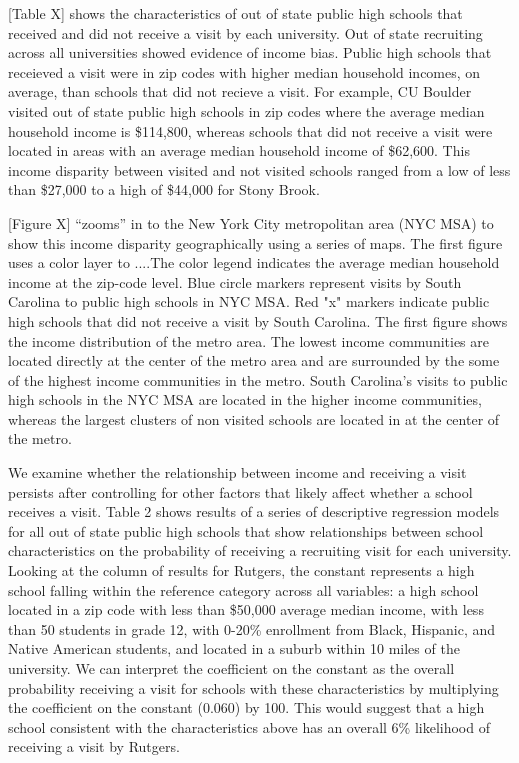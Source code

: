 \documentclass[twoside]{article}
\begin{document}
[Table X] shows the characteristics of out of state public high schools that received and did not receive a visit by each university. Out of state recruiting across all universities showed evidence of income bias. Public high schools that receieved a visit were in zip codes with higher median household incomes, on average, than schools that did not recieve a visit. For example, CU Boulder visited out of state public high schools in zip codes where the average median household income is \$114,800, whereas schools that did not receive a visit were located in areas with an average median household income of \$62,600. This income disparity between visited and not visited schools ranged from a low of less than \$27,000 to a high of \$44,000 for Stony Brook. 

[Figure X] “zooms” in to the New York City metropolitan area (NYC MSA) to show this income disparity geographically using a series of maps. The first figure uses a color layer to ....The color legend indicates the average median household income at the zip-code level. Blue circle markers represent visits by South Carolina to public high schools in NYC MSA. Red "x" markers indicate public high schools that did not receive a visit by South Carolina. The first figure shows the income distribution of the metro area. The lowest income communities are located directly at the center of the metro area and are surrounded by the some of the highest income communities in the metro. South Carolina's visits to public high schools in the NYC MSA are located in the higher income communities, whereas the largest clusters of non visited schools are located in at the center of the metro. 

We examine whether the relationship between income and receiving a visit persists after controlling for other factors that likely affect whether a school receives a visit. Table 2 shows results of a series of descriptive regression models for all out of state public high schools that show relationships between school characteristics on the probability of receiving a recruiting visit for each university. Looking at the column of results for Rutgers, the constant represents a high school falling within the reference category across all variables: a high school located in a zip code with less than \$50,000 average median income, with less than 50 students in grade 12, with 0-20\% enrollment from Black, Hispanic, and Native American students, and located in a suburb within 10 miles of the university.  We can interpret the coefficient on the constant as the overall probability receiving a visit for schools with these characteristics by multiplying the coefficient on the constant (0.060) by 100. This would suggest that a high school consistent with the characteristics above has an overall 6\% likelihood of receiving a visit by Rutgers. 
\end{document}
